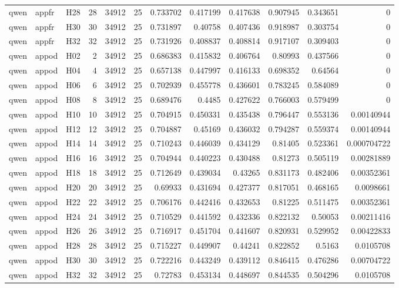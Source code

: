 \begin{longtable}{lllrrrrrrrrr}
qwen & appfr & H28 & 28 & 34912 & 25 & 0.733702 & 0.417199 & 0.417638 & 0.907945 & 0.343651 & 0 \\
qwen & appfr & H30 & 30 & 34912 & 25 & 0.731897 & 0.40758 & 0.407436 & 0.918987 & 0.303754 & 0 \\
qwen & appfr & H32 & 32 & 34912 & 25 & 0.731926 & 0.408837 & 0.408814 & 0.917107 & 0.309403 & 0 \\
qwen & appod & H02 & 2 & 34912 & 25 & 0.686383 & 0.415832 & 0.406764 & 0.80993 & 0.437566 & 0 \\
qwen & appod & H04 & 4 & 34912 & 25 & 0.657138 & 0.447997 & 0.416133 & 0.698352 & 0.64564 & 0 \\
qwen & appod & H06 & 6 & 34912 & 25 & 0.702939 & 0.455778 & 0.436601 & 0.783245 & 0.584089 & 0 \\
qwen & appod & H08 & 8 & 34912 & 25 & 0.689476 & 0.4485 & 0.427622 & 0.766003 & 0.579499 & 0 \\
qwen & appod & H10 & 10 & 34912 & 25 & 0.704915 & 0.450331 & 0.435438 & 0.796447 & 0.553136 & 0.00140944 \\
qwen & appod & H12 & 12 & 34912 & 25 & 0.704887 & 0.45169 & 0.436032 & 0.794287 & 0.559374 & 0.00140944 \\
qwen & appod & H14 & 14 & 34912 & 25 & 0.710243 & 0.446039 & 0.434129 & 0.81405 & 0.523361 & 0.000704722 \\
qwen & appod & H16 & 16 & 34912 & 25 & 0.704944 & 0.440223 & 0.430488 & 0.81273 & 0.505119 & 0.00281889 \\
qwen & appod & H18 & 18 & 34912 & 25 & 0.712649 & 0.439034 & 0.43265 & 0.831173 & 0.482406 & 0.00352361 \\
qwen & appod & H20 & 20 & 34912 & 25 & 0.69933 & 0.431694 & 0.427377 & 0.817051 & 0.468165 & 0.0098661 \\
qwen & appod & H22 & 22 & 34912 & 25 & 0.706176 & 0.442416 & 0.432653 & 0.81225 & 0.511475 & 0.00352361 \\
qwen & appod & H24 & 24 & 34912 & 25 & 0.710529 & 0.441592 & 0.432336 & 0.822132 & 0.50053 & 0.00211416 \\
qwen & appod & H26 & 26 & 34912 & 25 & 0.716917 & 0.451704 & 0.441607 & 0.820931 & 0.529952 & 0.00422833 \\
qwen & appod & H28 & 28 & 34912 & 25 & 0.715227 & 0.449907 & 0.44241 & 0.822852 & 0.5163 & 0.0105708 \\
qwen & appod & H30 & 30 & 34912 & 25 & 0.722216 & 0.443249 & 0.439112 & 0.846415 & 0.476286 & 0.00704722 \\
qwen & appod & H32 & 32 & 34912 & 25 & 0.72783 & 0.453134 & 0.448697 & 0.844535 & 0.504296 & 0.0105708 \\

\end{longtable}
